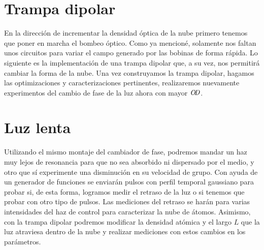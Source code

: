 \section{\label{sec:trampaDipolar}Trampa dipolar}

En la dirección de incrementar la densidad óptica de la nube primero tenemos que poner en marcha el bombeo óptico. Como ya mencioné, solamente nos faltan unos circuitos para variar el campo generado por las bobinas de forma rápida. Lo siguiente es la implementación de una trampa dipolar que, a su vez, nos permitirá cambiar la forma de la nube. Una vez construyamos la trampa dipolar, hagamos las optimizaciones y caracterizaciones pertinentes, realizaremos nuevamente experimentos del cambio de fase de la luz ahora con mayor $\OD$.

\section{\label{sec:luzLenta}Luz lenta}

Utilizando el mismo montaje del cambiador de fase, podremos mandar un haz muy lejos de resonancia para que no sea absorbido ni dispersado por el medio, y otro que sí experimente una disminución en su velocidad de grupo. Con ayuda de un generador de funciones se enviarán pulsos con perfil temporal gaussiano para probar si, de esta forma, logramos medir el retraso de la luz o si tenemos que probar con otro tipo de pulsos. Las mediciones del retraso se harán para varias intensidades del haz de control para caracterizar la nube de átomos. Asimismo, con la trampa dipolar podremos modificar la densidad atómica y el largo $L$ que la luz atraviesa dentro de la nube y realizar mediciones con estos cambios en los parámetros.